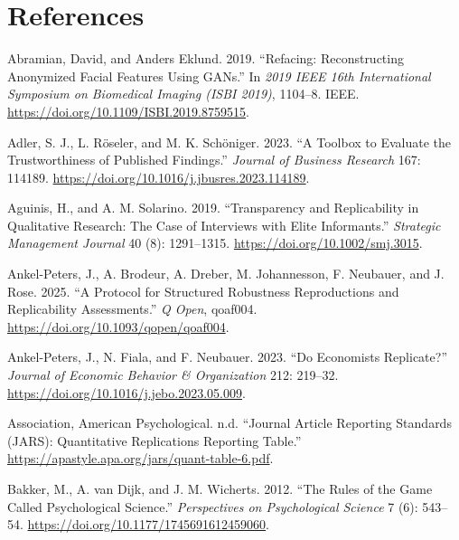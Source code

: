 \documentclass[
  letterpaper,
  DIV=11,
  openany,
  fontsize=12pt,
  parskip=half,
  headings=big,
  numbers=noenddot,
  titlepage=false]{scrreprt}
\newlength{\cslhangindent}
\newenvironment{CSLReferences}[2] %
 {\begin{list}{}{%
  \setlength{\itemindent}{0pt}
  \setlength{\leftmargin}{0pt}
  \setlength{\parsep}{0pt}
  \ifodd #1
   \setlength{\leftmargin}{\cslhangindent}
   \setlength{\itemindent}{-1\cslhangindent}
  \fi
  \setlength{\itemsep}{#2\baselineskip}}}
 {\end{list}}
\begin{document}

\chapter*{References}\label{references}


\label{refs}
\begin{CSLReferences}{1}{0}
Abramian, David, and Anders Eklund. 2019. {``Refacing: Reconstructing
Anonymized Facial Features Using GANs.''} In \emph{2019 IEEE 16th
International Symposium on Biomedical Imaging (ISBI 2019)}, 1104--8.
IEEE. \url{https://doi.org/10.1109/ISBI.2019.8759515}.

Adler, S. J., L. Röseler, and M. K. Schöniger. 2023. {``A Toolbox to
Evaluate the Trustworthiness of Published Findings.''} \emph{Journal of
Business Research} 167: 114189.
\url{https://doi.org/10.1016/j.jbusres.2023.114189}.

Aguinis, H., and A. M. Solarino. 2019. {``Transparency and Replicability
in Qualitative Research: The Case of Interviews with Elite
Informants.''} \emph{Strategic Management Journal} 40 (8): 1291--1315.
\url{https://doi.org/10.1002/smj.3015}.

Ankel-Peters, J., A. Brodeur, A. Dreber, M. Johannesson, F. Neubauer,
and J. Rose. 2025. {``A Protocol for Structured Robustness Reproductions
and Replicability Assessments.''} \emph{Q Open}, qoaf004.
\url{https://doi.org/10.1093/qopen/qoaf004}.

Ankel-Peters, J., N. Fiala, and F. Neubauer. 2023. {``Do Economists
Replicate?''} \emph{Journal of Economic Behavior \& Organization} 212:
219--32. \url{https://doi.org/10.1016/j.jebo.2023.05.009}.

Association, American Psychological. n.d. {``Journal Article Reporting
Standards (JARS): Quantitative Replications Reporting Table.''}
\url{https://apastyle.apa.org/jars/quant-table-6.pdf}.

Bakker, M., A. van Dijk, and J. M. Wicherts. 2012. {``The Rules of the
Game Called Psychological Science.''} \emph{Perspectives on
Psychological Science} 7 (6): 543--54.
\url{https://doi.org/10.1177/1745691612459060}.


\end{CSLReferences}
\end{document}
